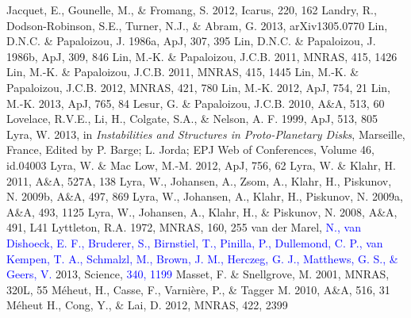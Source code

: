 \documentclass[apj]{emulateapj}
\def\blue#1{\textcolor{blue}{ #1}}
\begin{document}
\begin{thebibliography}{}
 Jacquet, E., Gounelle, M., \& Fromang, S. 2012, Icarus, 220, 162
 Landry, R., Dodson-Robinson, S.E., Turner, N.J., \& Abram, G. 2013, arXiv1305.0770
 Lin, D.N.C. \& Papaloizou, J. 1986a, ApJ, 307, 395
 Lin, D.N.C. \& Papaloizou, J. 1986b, ApJ, 309, 846
 Lin, M.-K. \& Papaloizou, J.C.B. 2011, MNRAS, 415, 1426
 Lin, M.-K. \& Papaloizou, J.C.B. 2011, MNRAS, 415, 1445
 Lin, M.-K. \& Papaloizou, J.C.B. 2012, MNRAS, 421, 780
 Lin, M.-K. 2012, ApJ, 754, 21
 Lin, M.-K. 2013, ApJ, 765, 84
 Lesur, G. \& Papaloizou, J.C.B. 2010, A\&A, 513, 60
 Lovelace, R.V.E., Li, H., Colgate, S.A., \& Nelson, A. F. 1999, ApJ, 513, 805
 Lyra, W. 2013, in {\it Instabilities and Structures in Proto-Planetary Disks}, Marseille, France, Edited by P. Barge; L. Jorda; EPJ Web of Conferences, Volume 46, id.04003 
 Lyra, W. \& Mac Low, M.-M. 2012, ApJ, 756, 62
 Lyra, W. \& Klahr,  H. 2011, A\&A, 527A, 138
 Lyra, W., Johansen, A., Zsom, A., Klahr, H., Piskunov, N. 2009b, A\&A, 497, 869
 Lyra, W., Johansen, A., Klahr, H., Piskunov, N. 2009a, A\&A, 493, 1125 
 Lyra, W., Johansen, A., Klahr, H., \& Piskunov, N. 2008, A\&A, 491, L41
 Lyttleton, R.A. 1972, MNRAS, 160, 255
 van der Marel,
  \blue{N., van Dishoeck, E. F., Bruderer, S., Birnstiel, T., Pinilla, P.,
  Dullemond, C. P., van Kempen, T. A., Schmalzl, M., Brown, J. M., Herczeg, G. J., Matthews, G. S., \& Geers, V.} 2013, Science, \blue{340, 1199}
 Masset, F. \& Snellgrove, M. 2001, MNRAS, 320L, 55
 M\'eheut, H., Casse, F., Varni\`ere, P., \& Tagger M. 2010, A\&A, 516, 31
 M\'eheut H., Cong, Y., \& Lai, D. 2012, MNRAS, 422, 2399

\end{thebibliography}
\end{document}
